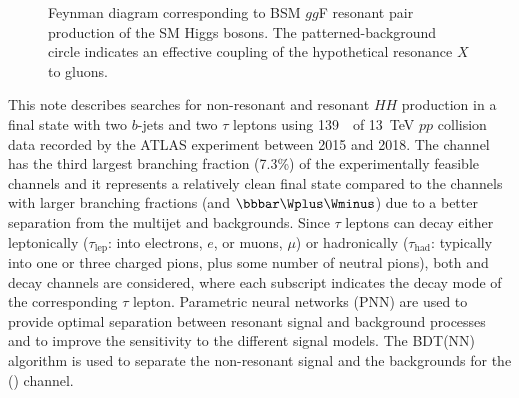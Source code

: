 \begin{figure}[!h]
\centering
{}
\caption{Feynman diagram corresponding to BSM $gg$F resonant pair production of the SM Higgs bosons. The patterned-background circle indicates an effective coupling of the hypothetical resonance $X$ to gluons.}
\label{fig:ResonantggFPairProduction}
\end{figure}

This note describes searches for non-resonant and resonant $HH$ production in a final state with two $b$-jets and two $\tau$ leptons using 139~\ifb\ of 
13~TeV $pp$ collision data recorded by the ATLAS experiment between 2015 and 2018. The \bbtt channel has the third largest branching fraction (7.3\%) of the experimentally feasible channels and it represents 
a relatively clean final state compared to the channels with larger branching fractions (\bbbb and $\bbbar\Wplus\Wminus$) due to a better separation from the multijet and \ttbar backgrounds. Since $\tau$ leptons 
can decay either leptonically ($\tau_{\mathrm{lep}}$: into electrons, $e$, or muons, $\mu$) or hadronically ($\tau_{\mathrm{had}}$: typically into one or three charged pions, plus some number of neutral pions), 
both \lephad and \hadhad decay channels are considered, where each subscript indicates the decay mode of the corresponding $\tau$ lepton. Parametric neural networks (PNN) are used to provide optimal 
separation between resonant signal and background processes and to improve the sensitivity to the different signal models. The BDT(NN) algorithm is used to separate the non-resonant signal and the backgrounds for the \hadhad (\lephad) channel.

